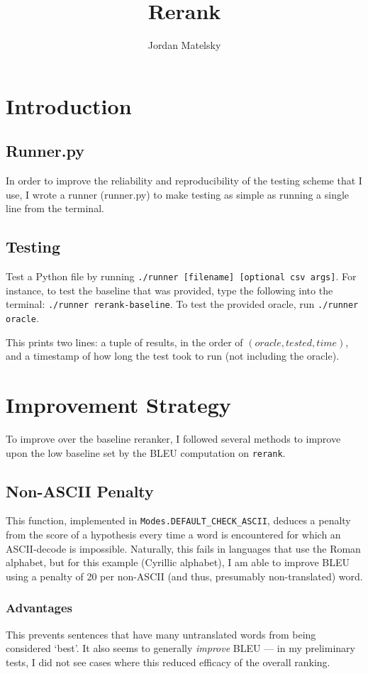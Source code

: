 \documentclass{article}
\title{Rerank}
\author{Jordan Matelsky}
\begin{document}
\maketitle

\section{Introduction}

\subsection{Runner.py}
In order to improve the reliability and reproducibility of the testing scheme that I use, I wrote a runner (runner.py) to make testing as simple as running a single line from the terminal.

\subsection{Testing}
Test a Python file by running \texttt{./runner [filename] [optional csv args]}. For instance, to test the baseline that was provided, type the following into the terminal: \texttt{./runner rerank-baseline}. To test the provided oracle, run \texttt{./runner oracle}.

This prints two lines: a tuple of results, in the order of $(oracle, tested, time)$, and a timestamp of how long the test took to run (not including the oracle).

\section{Improvement Strategy}
To improve over the baseline reranker, I followed several methods to improve upon the low baseline set by the BLEU computation on \texttt{rerank}.

\subsection{Non-ASCII Penalty}
This function, implemented in \texttt{Modes.DEFAULT\_CHECK\_ASCII}, deduces a penalty from the score of a hypothesis every time a word is encountered for which an ASCII-decode is impossible. Naturally, this fails in languages that use the Roman alphabet, but for this example (Cyrillic alphabet), I am able to improve BLEU using a penalty of 20 per non-ASCII (and thus, presumably non-translated) word.

\subsubsection{Advantages}
This prevents sentences that have many untranslated words from being considered `best'. It also seems to generally \textit{improve} BLEU — in my preliminary tests, I did not see cases where this reduced efficacy of the overall ranking.
\end{document}
